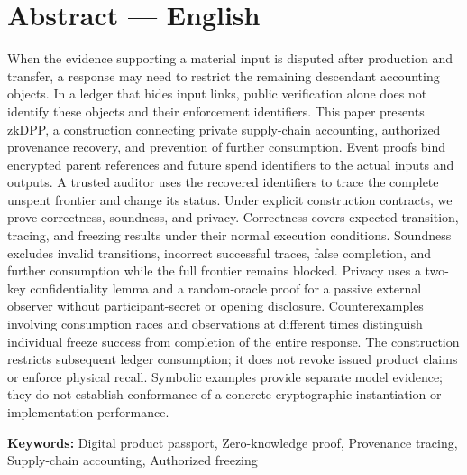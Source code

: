 \section*{Abstract — English}
When the evidence supporting a material input is disputed after production and transfer, a response may need to restrict the remaining descendant accounting objects.
In a ledger that hides input links, public verification alone does not identify these objects and their enforcement identifiers.
This paper presents zkDPP, a construction connecting private supply-chain accounting, authorized provenance recovery, and prevention of further consumption.
Event proofs bind encrypted parent references and future spend identifiers to the actual inputs and outputs.
A trusted auditor uses the recovered identifiers to trace the complete unspent frontier and change its status.
Under explicit construction contracts, we prove correctness, soundness, and privacy.
Correctness covers expected transition, tracing, and freezing results under their normal execution conditions.
Soundness excludes invalid transitions, incorrect successful traces, false completion, and further consumption while the full frontier remains blocked.
Privacy uses a two-key confidentiality lemma and a random-oracle proof for a passive external observer without participant-secret or opening disclosure.
Counterexamples involving consumption races and observations at different times distinguish individual freeze success from completion of the entire response.
The construction restricts subsequent ledger consumption; it does not revoke issued product claims or enforce physical recall.
Symbolic examples provide separate model evidence; they do not establish conformance of a concrete cryptographic instantiation or implementation performance.

\textbf{Keywords:} Digital product passport, Zero-knowledge proof, Provenance tracing, Supply-chain accounting, Authorized freezing

